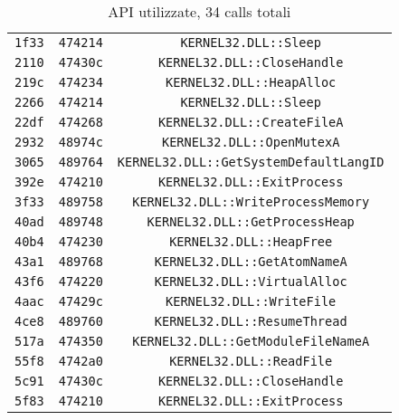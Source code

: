 \documentclass[
    a4paper, %
    11pt %
]{article}
\begin{document}
\begin{table}[h!]
\begin{center}
\begin{tabular}{|c|c|c|}
                \texttt{1f33} & \texttt{474214} & \texttt{KERNEL32.DLL::Sleep} \\
                \texttt{2110} & \texttt{47430c} & \texttt{KERNEL32.DLL::CloseHandle} \\
                \texttt{219c} & \texttt{474234} & \texttt{KERNEL32.DLL::HeapAlloc} \\
                \texttt{2266} & \texttt{474214} & \texttt{KERNEL32.DLL::Sleep} \\
                \texttt{22df} & \texttt{474268} & \texttt{KERNEL32.DLL::CreateFileA} \\
                \texttt{2932} & \texttt{48974c} & \texttt{KERNEL32.DLL::OpenMutexA} \\
                \texttt{3065} & \texttt{489764} & \texttt{KERNEL32.DLL::GetSystemDefaultLangID} \\
                \texttt{392e} & \texttt{474210} & \texttt{KERNEL32.DLL::ExitProcess} \\
                \texttt{3f33} & \texttt{489758} & \texttt{KERNEL32.DLL::WriteProcessMemory} \\
                \texttt{40ad} & \texttt{489748} & \texttt{KERNEL32.DLL::GetProcessHeap} \\
                \texttt{40b4} & \texttt{474230} & \texttt{KERNEL32.DLL::HeapFree} \\
                \texttt{43a1} & \texttt{489768} & \texttt{KERNEL32.DLL::GetAtomNameA} \\
                \texttt{43f6} & \texttt{474220} & \texttt{KERNEL32.DLL::VirtualAlloc} \\
                \texttt{4aac} & \texttt{47429c} & \texttt{KERNEL32.DLL::WriteFile} \\
                \texttt{4ce8} & \texttt{489760} & \texttt{KERNEL32.DLL::ResumeThread} \\
                \texttt{517a} & \texttt{474350} & \texttt{KERNEL32.DLL::GetModuleFileNameA} \\
                \texttt{55f8} & \texttt{4742a0} & \texttt{KERNEL32.DLL::ReadFile} \\
                \texttt{5c91} & \texttt{47430c} & \texttt{KERNEL32.DLL::CloseHandle} \\
                \texttt{5f83} & \texttt{474210} & \texttt{KERNEL32.DLL::ExitProcess} \\
                \hline
            \end{tabular}
            \caption{API utilizzate, 34 calls totali}
            \label{table:apiusage}
            \end{center}
            \end{table}
\end{document}
